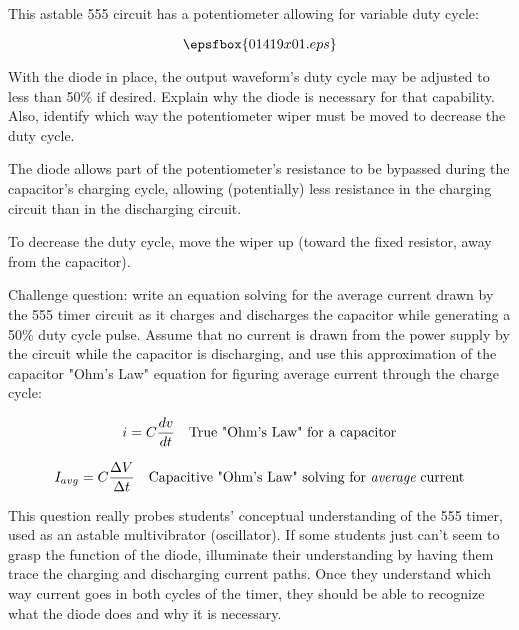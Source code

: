 

This astable 555 circuit has a potentiometer allowing for variable duty cycle:

$$\epsfbox{01419x01.eps}$$

With the diode in place, the output waveform's duty cycle may be adjusted to less than 50\% if desired.  Explain why the diode is necessary for that capability.  Also, identify which way the potentiometer wiper must be moved to decrease the duty cycle.







The diode allows part of the potentiometer's resistance to be bypassed during the capacitor's charging cycle, allowing (potentially) less resistance in the charging circuit than in the discharging circuit.

To decrease the duty cycle, move the wiper up (toward the fixed resistor, away from the capacitor).

\vskip 10pt

Challenge question: write an equation solving for the average current drawn by the 555 timer circuit as it charges and discharges the capacitor while generating a 50\% duty cycle pulse.  Assume that no current is drawn from the power supply by the circuit while the capacitor is discharging, and use this approximation of the capacitor "Ohm's Law" equation for figuring average current through the charge cycle:

$$i = C {dv \over dt} \hbox{\hskip 10pt True "Ohm's Law" for a capacitor}$$

$$I_{avg} = C {\Delta V \over \Delta t} \hbox{\hskip 10pt Capacitive "Ohm's Law" solving for {\it average} current}$$







This question really probes students' conceptual understanding of the 555 timer, used as an astable multivibrator (oscillator).  If some students just can't seem to grasp the function of the diode, illuminate their understanding by having them trace the charging and discharging current paths.  Once they understand which way current goes in both cycles of the timer, they should be able to recognize what the diode does and why it is necessary.




